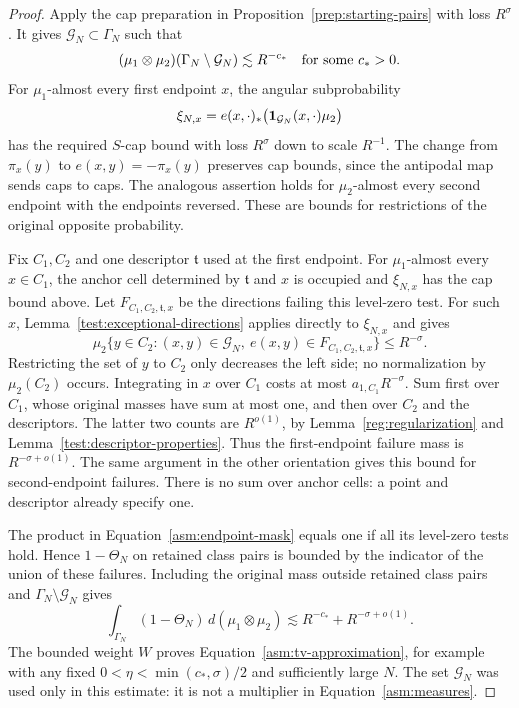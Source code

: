 \begin{proof}
Apply the cap preparation in Proposition~\ref{prep:starting-pairs} with
loss $R^\sigma$.  It gives $\mathcal G_N\subset\Gamma_N$ such that
\[
 (\mu_1\otimes\mu_2)(\Gamma_N\setminus\mathcal G_N)
       \lesssim R^{-c_*}
 \quad\hbox{for some }c_*>0.
\]
For $\mu_1$-almost every first endpoint $x$, the angular subprobability
\[
 \xi_{N,x}=e(x,\cdot)_*
             \bigl(\mathbf 1_{\mathcal G_N}(x,\cdot)\mu_2\bigr)
\]
has the required $S$-cap bound with loss $R^\sigma$ down to scale
$R^{-1}$.  The change from $\pi_x(y)$ to $e(x,y)=-\pi_x(y)$ preserves
cap bounds, since the antipodal map sends caps to caps.  The analogous
assertion holds for $\mu_2$-almost every second endpoint with the
endpoints reversed.
These are bounds for restrictions of the original opposite probability.

Fix $C_1,C_2$ and one descriptor $\mathfrak t$ used at the first endpoint.
For $\mu_1$-almost every $x\in C_1$, the anchor cell determined by
$\mathfrak t$ and $x$ is occupied and $\xi_{N,x}$ has the cap bound above.  Let
$F_{C_1,C_2,\mathfrak t,x}$ be the directions failing this level-zero test.
For such $x$, Lemma~\ref{test:exceptional-directions} applies directly
to $\xi_{N,x}$ and gives
\begin{equation}
 \label{asm:original-fiber-estimate}
 \mu_2\{y\in C_2:(x,y)\in\mathcal G_N,
       \ e(x,y)\in F_{C_1,C_2,\mathfrak t,x}\}\le R^{-\sigma}.
\end{equation}
Restricting the set of $y$ to $C_2$ only decreases the left side; no
normalization by $\mu_2(C_2)$ occurs.  Integrating in $x$ over $C_1$
costs at most $a_{1,C_1}R^{-\sigma}$.  Sum first over $C_1$, whose
original masses have sum at most one, and then over $C_2$ and the
descriptors.  The latter two counts are $R^{o(1)}$, by
Lemma~\ref{reg:regularization} and
Lemma~\ref{test:descriptor-properties}.  Thus the first-endpoint
failure mass is $R^{-\sigma+o(1)}$.  The same argument in the other
orientation gives this bound for second-endpoint failures.  There is
no sum over anchor cells: a point and descriptor already specify one.

The product in Equation~\eqref{asm:endpoint-mask} equals one if all
its level-zero tests hold.  Hence $1-\Theta_N$ on retained class pairs is
bounded by the indicator of the union of these failures.  Including
the original mass outside retained class pairs and
$\Gamma_N\setminus\mathcal G_N$ gives
\[
 \int_{\Gamma_N}(1-\Theta_N)\,d(\mu_1\otimes\mu_2)
 \lesssim R^{-c_*}+R^{-\sigma+o(1)}.
\]
The bounded weight $W$ proves Equation~\eqref{asm:tv-approximation},
for example with any fixed
$0<\eta<\min(c_*,\sigma)/2$ and sufficiently large $N$.
The set $\mathcal G_N$ was used only in this estimate: it is not a
multiplier in Equation~\eqref{asm:measures}.


\end{proof}
